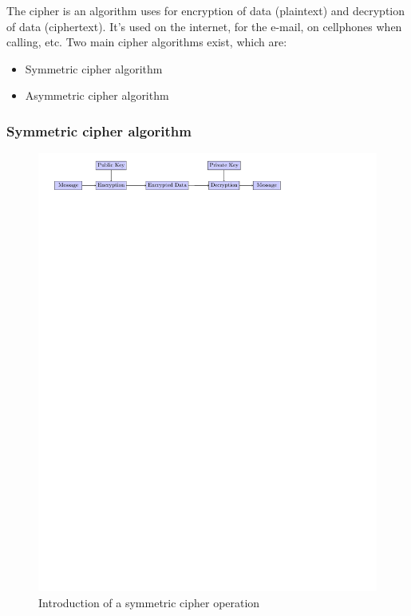  The cipher is an algorithm uses for encryption of data (plaintext) and
 decryption of data (ciphertext).
 It's used on the internet, for the e-mail, on cellphones when calling, etc.
 Two main cipher algorithms exist, which are:
 \begin{itemize}[noitemsep]
   \item Symmetric cipher algorithm
   \item Asymmetric cipher algorithm
 \end{itemize}


\subsubsection{Symmetric cipher algorithm}
\label{intro_sym_cipher}

\begin{figure}[!ht]
\centering
\includegraphics[trim=0cm 25.25cm 5cm 0cm]{figures/intro_sym_cipher.pdf}
\caption{Introduction of a symmetric cipher operation}
\label{fig:sym}

\end{figure}

